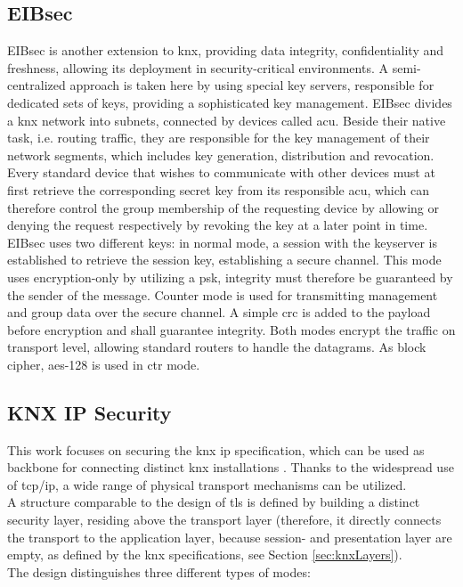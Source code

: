 \subsection{EIBsec}

EIBsec is another extension to \gls{knx}, providing data integrity, confidentiality and freshness, allowing its deployment in security-critical environments.
A semi-centralized approach is taken here by using special key servers, responsible for dedicated sets
of keys, providing a sophisticated key management. EIBsec divides a \gls{knx} network into subnets, connected by devices called \gls{acu}. Beside their native
task, i.e. routing traffic, they
 are responsible for the key management of their network segments, which includes key generation, distribution and revocation. Every standard device that
 wishes to communicate with other devices must at first retrieve the corresponding secret key from its responsible \gls{acu}, which can therefore control the
 group membership of the requesting device by allowing or denying the request respectively by revoking the key at a later point in time.
\\
EIBsec uses two different keys: in normal mode, a session with the keyserver is established to retrieve the session key, establishing a secure channel.
This mode uses encryption-only by utilizing a \gls{psk}, integrity must therefore be guaranteed by the sender of the message. Counter mode is used for transmitting management and
group data over the secure channel. A simple \gls{crc} is added to the payload before encryption and shall guarantee integrity. Both modes encrypt the traffic
on transport level, allowing standard routers to handle the datagrams. As block cipher, \gls{aes}-128 is used in \gls{ctr} mode.

\subsection{KNX IP Security}

This work focuses on securing the \gls{knx} \gls{ip} specification, which can be used as backbone for connecting distinct \gls{knx} installations \cite{5195839}.
Thanks to the widespread use of \gls{tcp}/\gls{ip}, a wide range of physical transport mechanisms can be utilized.
\\
A structure comparable to the design of \gls{tls} is defined by building a distinct security layer, residing above the transport layer (therefore, it directly
connects the transport to the application layer, because session- and presentation layer are empty, as defined by the \gls{knx} specifications, see Section
\ref{sec:knxLayers}).
\\
The design distinguishes three different types of modes: 

